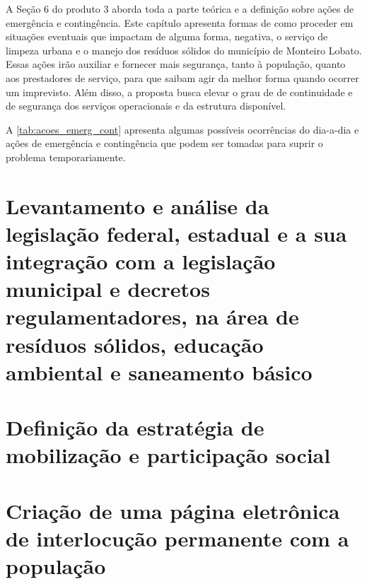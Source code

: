 A Seção 6 do produto 3 aborda toda a parte teórica e a definição sobre ações de emergência e contingência. Este capítulo apresenta formas de como proceder em situações eventuais que impactam de alguma forma, negativa, o serviço de limpeza urbana e o manejo dos resíduos sólidos do município de Monteiro Lobato. Essas ações irão auxiliar e fornecer mais segurança, tanto à população, quanto aos prestadores de serviço, para que saibam agir da melhor forma quando ocorrer um imprevisto. Além disso, a proposta busca elevar o grau de de continuidade e de segurança dos serviços operacionais e da estrutura disponível.

A \autoref{tab:acoes_emerg_cont} apresenta algumas possíveis ocorrências do dia-a-dia e ações de emergência e contingência que podem ser tomadas para suprir o problema temporariamente.





\FloatBarrier
\newpage
\section{Levantamento e análise da legislação federal, estadual e a sua integração com a legislação municipal e decretos regulamentadores, na área de resíduos sólidos, educação ambiental e saneamento básico}
\label{sec:legislacao}

\FloatBarrier
\newpage
\section{Definição da estratégia de mobilização e participação social}
\label{sec:mobiliz_social}

\FloatBarrier
\newpage
\section{Criação de uma página eletrônica de interlocução permanente com a população}
\label{sec:pag_elet}


